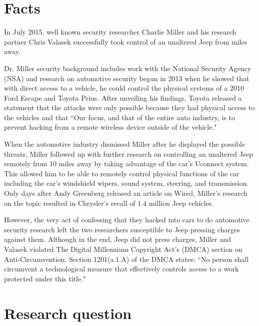 \documentclass[12pt]{article}
\begin{document}
\tableofcontents
\newpage
\begin{multicols}{2}

\section{Facts}

In July 2015, well known security researcher Charlie Miller and his research partner Chris Valasek successfully took control of an unaltered Jeep from miles away. \cite{wired}

Dr. Miller security background includes work with the National Security Agency (NSA) and  research on automotive security begun in 2013 when he showed that with direct access to a vehicle, he could control the physical systems of a 2010 Ford Escape and Toyota Prius. \cite{officialPaper} After unveiling his findings, Toyota released a statement that the attacks were only possible because they had physical access to the vehicles and that ``Our focus, and that of the entire auto industry, is to prevent hacking from a remote wireless device outside of the vehicle." \cite{originalHack}

When the automotive industry dismissed Miller after he displayed the possible threats, Miller followed up with further research on controlling an unaltered Jeep remotely from 10 miles away by taking advantage of the car's Uconnect system. \cite{officialPaper} This allowed him to be able to remotely control physical functions of the car including the car's windshield wipers, sound system, steering, and transmission. \cite{wired}  Only days after Andy Greenberg released an article on Wired, Miller's research on the topic resulted in Chrysler's recall of 1.4 million Jeep vehicles.\cite{recall} 

However, the very act of confessing that they hacked into cars to do automotive security research left the two researchers susceptible to Jeep pressing charges against them. \cite{brokeDMCA} Although in the end, Jeep did not press charges, Miller and Valasek violated The Digital Millennium Copyright Act's (DMCA) section on Anti-Circumvention. Section 1201(a.1.A) of the DMCA states: ``No person shall circumvent a technological measure that effectively controls access to a work protected under this title."\cite{DMCA}


\section{Research question} 


\end{multicols}
\end{document}
